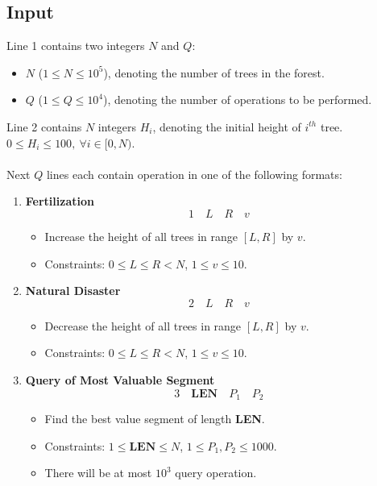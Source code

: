 \documentclass[12pt,a4paper]{article}
\begin{document}
\subsection*{\fontsize{16}{12}Input}
Line 1 contains two integers $N$ and $Q$:
\begin{itemize}
    \item \( N \) (\( 1 \leq N \leq 10^5 \)), denoting the number of trees in the forest.
    \item \( Q \) (\( 1 \leq Q \leq 10^4 \)), denoting the number of operations to be performed.
\end{itemize}
\noindent
Line 2 contains \(N\) integers $H_i$, denoting the initial height of $i^{th}$ tree. \( 0 \leq H_i \leq 100,\ \forall i \in [0,N)\).
\\\\
\noindent
Next $Q$ lines each contain operation in one of the following formats:

\begin{enumerate}
    \item \textbf{Fertilization}
    \[1 \quad L \quad R \quad v\]
        \begin{itemize}
            \item Increase the height of all trees in range \( [L, R] \) by \( v \).
            \item Constraints: \( 0 \leq L \leq R < N \), \( 1 \leq v \leq 10 \).
        \end{itemize}
    \item \textbf{Natural Disaster}
    \[2 \quad L \quad R \quad v\]
        \begin{itemize}
            \item Decrease the height of all trees in range \( [L, R] \) by \( v \).
            \item Constraints: \( 0 \leq L \leq R < N \), \( 1 \leq v \leq 10 \).
        \end{itemize}
    \item \textbf{Query of Most Valuable Segment}
    \[
    3 \quad \textbf{LEN} \quad P_1 \quad P_2
    \]
    \begin{itemize}
        \item Find the best value segment of length \textbf{LEN}.
        \item Constraints: \( 1 \leq \textbf{LEN} \leq N \), \( 1 \leq P_1,P_2 \leq 1000 \).
        \item There will be at most $10^3$ query operation.
    \end{itemize}
\end{enumerate}
\end{document}
